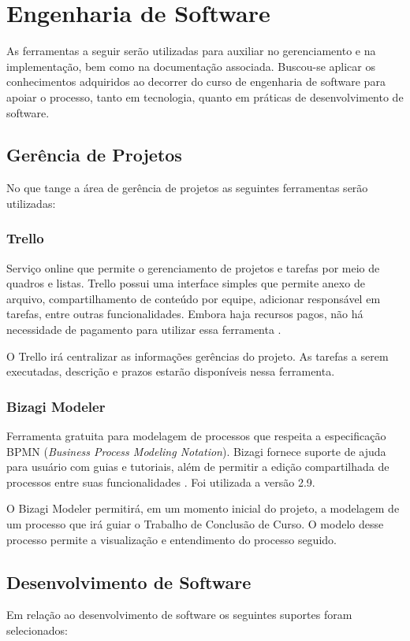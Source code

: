 \section{Engenharia de Software}
As ferramentas a seguir serão utilizadas para auxiliar no gerenciamento e na implementação, bem como na documentação associada. Buscou-se aplicar os conhecimentos adquiridos ao decorrer do curso de engenharia de software para apoiar o processo, tanto em tecnologia, quanto em práticas de desenvolvimento de software.

\subsection{Gerência de Projetos}
No que tange a área de gerência de projetos as seguintes ferramentas serão utilizadas:

\subsubsection{Trello} 
Serviço online que permite o gerenciamento de projetos e tarefas por meio de quadros e listas. Trello possui uma interface simples que permite anexo de arquivo, compartilhamento de conteúdo por equipe, adicionar responsável em tarefas,  entre outras funcionalidades. Embora haja recursos pagos, não há necessidade de pagamento para utilizar essa ferramenta \cite{trello2015}.
\par
\indent O Trello irá centralizar as informações gerências do projeto. As tarefas a serem executadas, descrição e prazos estarão disponíveis nessa ferramenta.

\subsubsection{Bizagi Modeler}
Ferramenta gratuita para modelagem de processos que respeita a especificação BPMN (\textit{Business Process Modeling Notation}). Bizagi fornece suporte de ajuda para usuário com guias e tutoriais, além de permitir a edição compartilhada de processos entre suas funcionalidades \cite{bizagi2015}. Foi utilizada a versão 2.9.
\par
\indent O Bizagi Modeler permitirá, em um momento inicial do projeto, a modelagem de um processo que irá guiar o Trabalho de Conclusão de Curso. O modelo desse processo permite a visualização e entendimento do processo seguido.

\subsection{Desenvolvimento de Software}
Em relação ao desenvolvimento de software os seguintes suportes foram selecionados:

